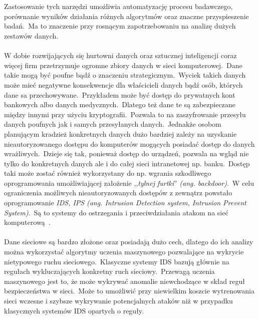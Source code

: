 \\ \\
Zastosowanie tych narzędzi umożliwia automatyzację procesu badawczego, porównanie wyników działania różnych algorytmów oraz znaczne przyspieszenie badań.\ Ma to znaczenie przy rosnącym zapotrzebowaniu na analizę dużych zestawów danych.
\\ \\
W dobie rozwijających się hurtowni danych oraz sztucznej inteligencji coraz więcej firm przetrzymuje ogromne zbiory danych w sieci komputerowej.\ Dane takie mogą być poufne bądź o znaczeniu strategicznym.\ Wyciek takich danych może mieć negatywne konsekwencje dla właścicieli danych bądź osób, których dane sa przechowywane.\ Przykładem może być dostęp do prywatnych kont bankowych albo danych medycznych.\ Dlatego też dane te są zabezpieczane między innymi przy użyciu kryptografii.\ Pozwala to na zaszyfrowanie przesyłu danych poufnych jak i samych przesyłanych danych.\ Jednakże osobom planującym kradzież konkretnych danych dużo bardziej zależy na uzyskanie nieautoryzowanego dostępu do komputerów mogących posiadać dostęp do danych wrażliwych.\ Dzieje się tak, ponieważ dostęp do urządzeń, pozwala na wgląd nie tylko do konkretnych danych ale i do całej sieci intranetowej np. banku.\ Dostęp taki może zostać również wykorzystany do np. wgrania szkodliwego oprogramowania umożliwiającej założenie ,,\textit{tylnej furtki}'' \textit{(ang. backdoor)}.\ W celu ograniczenia możliwych nieautoryzowanych dostępów z zewnątrz powstało oprogramowanie \textit{IDS, IPS} \textit{(ang. Intrusion Detection system, Intrusion Prevent System)}.\ Są to systemy do ostrzegania i przeciwdziałania atakom na sieć komputerową~\cite{Blyszcz2022}.
\\ \\
Dane sieciowe są bardzo złożone oraz posiadają dużo cech, dlatego do ich analizy można wykorzystać algorytmy uczenia maszynowego pozwalające na wykrycie nietypowego ruchu sieciowego.\ Klasyczne systemy IDS bazują głównie na regułach wykluczających konkretny ruch sieciowy.\ Przewagą uczenia maszynowego jest to, że może wykrywać anomalie niewchodzące w skład reguł bezpieczeństwa w sieci.\ Może to umożliwić przy niewielkim koszcie wytrenowania sieci wczesne i szybsze wykrywanie potencjalnych ataków niż w przypadku klasycznych systemów IDS opartych o reguły.

